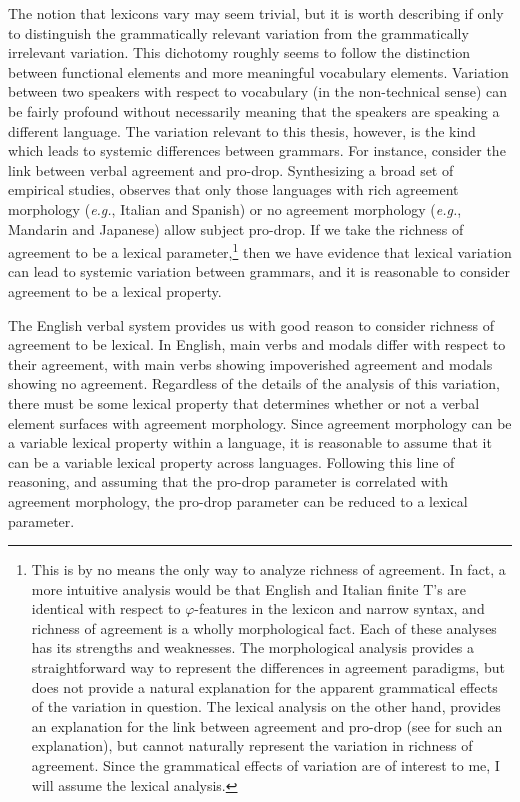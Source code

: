 \documentclass[MilwayThesis]{subfiles}
\begin{document}
The notion that lexicons vary may seem trivial, but it is worth describing if only to distinguish the grammatically relevant variation from the grammatically irrelevant variation.
This dichotomy roughly seems to follow the distinction between functional elements and more meaningful vocabulary elements.
Variation between two speakers with respect to vocabulary (in the non-technical sense) can be fairly profound without necessarily meaning that the speakers are speaking a different language.
The variation relevant to this thesis, however, is the kind which leads to systemic differences between grammars.
For instance, consider the link between verbal agreement and pro-drop.
Synthesizing a broad set of empirical studies, \textcite{huang1984distribution} observes that only those languages with rich agreement morphology (\textit{e.g.}, Italian and Spanish) or no agreement morphology (\textit{e.g.}, Mandarin and Japanese) allow subject pro-drop.
If we take the richness of agreement to be a lexical parameter,\footnote{
	This is by no means the only way to analyze richness of agreement.
	In fact, a more intuitive analysis would be that English and Italian finite T's are identical with respect to $\varphi$-features in the lexicon and narrow syntax, and richness of agreement is a wholly morphological fact.
	Each of these analyses has its strengths and weaknesses.
	The morphological analysis provides a straightforward way to represent the differences in agreement paradigms, but does not provide a natural explanation for the apparent grammatical effects of the variation in question.
	The lexical analysis on the other hand, provides an explanation for the link between agreement and pro-drop (see \cite{chomsky2015problems} for such an explanation), but cannot naturally represent the variation in richness of agreement.
	Since the grammatical effects of variation are of interest to me, I will assume the lexical analysis.
} then we have evidence that lexical variation can lead to systemic variation between grammars, and it is reasonable to consider agreement to be a lexical property.

The English verbal system provides us with good reason to consider richness of agreement to be lexical.
In English, main verbs and modals differ with respect to their agreement, with main verbs showing impoverished agreement and modals showing no agreement.
Regardless of the details of the analysis of this variation, there must be some lexical property that determines whether or not a verbal element surfaces with agreement morphology.
Since agreement morphology can be a variable lexical property within a language, it is reasonable to assume that it can be a variable lexical property across languages.
Following this line of reasoning, and assuming that the pro-drop parameter is correlated with agreement morphology, the pro-drop parameter can be reduced to a lexical parameter.
\end{document}
